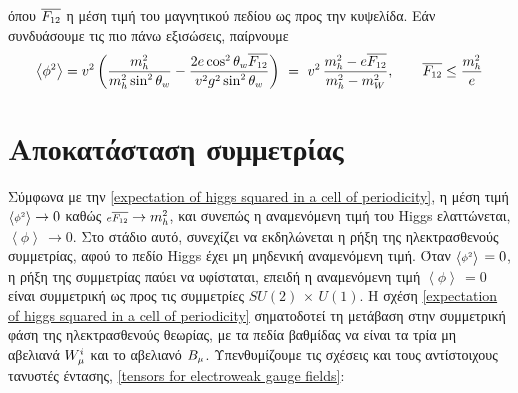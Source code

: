 όπου $\overline{F\subscr{12}}$ η μέση τιμή του μαγνητικού πεδίου ως προς την κυψελίδα. Εάν συνδυάσουμε τις πιο πάνω εξισώσεις, παίρνουμε 
\begin{equation}\label{expectation of higgs squared in a cell of periodicity}
    \left<\phi\superscr{2}\right>=v\superscr{2}\left( \frac{m\subscr{h}\superscr{2}}{m\subscr{h}\superscr{2}\sin\superscr{2}\theta\subscr{w}}-\frac{2e\cos\superscr{2}\theta\subscr{w}\overline{F\subscr{12}}}{v\superscr{2}g\superscr{2}\sin\superscr{2}\theta\subscr{w}} \right)\,\,=\,\,v\superscr{2}\, \frac{m\subscr{h}\superscr{2}-e\overline{F\subscr{12}}}{m\subscr{h}\superscr{2}-m\subscr{W}\superscr{2}},\qquad \overline{F\subscr{12}}\le \frac{m\subscr{h}\superscr{2}}{e}
\end{equation}

\section{Αποκατάσταση συμμετρίας}
Σύμφωνα με την \eqref{expectation of higgs squared in a cell of periodicity}, η μέση τιμή ${\scriptstyle\left<\phi\superscr{2}\right>}\rightarrow 0$ καθώς ${\scriptstyle e\overline{F\subscr{12}}}\rightarrow m\subscr{h}\superscr{2}$, και συνεπώς η αναμενόμενη τιμή του Higgs ελαττώνεται, ${\scriptstyle\left<\phi\right>\,}\rightarrow 0$. Στο στάδιο αυτό, συνεχίζει να εκδηλώνεται η ρήξη της ηλεκτρασθενούς συμμετρίας, αφού το πεδίο Higgs έχει μη μηδενική αναμενόμενη τιμή. Όταν ${\scriptstyle\left<\phi\superscr{2}\right>\,}=0$, η ρήξη της συμμετρίας παύει να υφίσταται, επειδή η αναμενόμενη τιμή ${\scriptstyle\left<\phi\right>\,}=0$ είναι συμμετρική ως προς τις συμμετρίες $SU(2)\,\times\,U(1)$. Η σχέση \eqref{expectation of higgs squared in a cell of periodicity}
σηματοδοτεί τη μετάβαση στην συμμετρική φάση της ηλεκτρασθενούς θεωρίας, με τα πεδία βαθμίδας να είναι τα τρία μη αβελιανά $W\superscr{i}\subscr{\mu}$ και το αβελιανό $B\subscr{\mu}$. Υπενθυμίζουμε τις σχέσεις και τους αντίστοιχους τανυστές έντασης, \eqref{tensors for electroweak gauge fields}:

